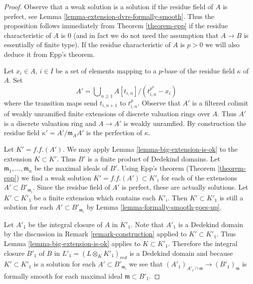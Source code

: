 \begin{proof}
Observe that a weak solution is a solution if the residue field of $A$
is perfect, see Lemma \ref{lemma-extension-dvrs-formally-smooth}.
Thus the proposition follows immediately from Theorem \ref{theorem-epp}
if the residue characteristic of $A$ is $0$ (and in fact we do not need
the assumption that $A \to B$ is essentially of finite type).
If the residue characteristic of $A$ is $p > 0$ we will also deduce it from
Epp's theorem.

\medskip\noindent
Let $x_i \in A$, $i \in I$ be a set of elements mapping to a $p$-base of
the residue field $\kappa$ of $A$. Set
$$
A' = \bigcup\nolimits_{n \geq 1} A[t_{i, n}]/(t_{i, n}^{p^n} - x_i)
$$
where the transition maps send $t_{i, n + 1}$ to $t_{i, n}^p$. Observe
that $A'$ is a filtered colimit of weakly unramified finite extensions
of discrete valuation rings over $A$. Thus $A'$ is a discrete valuation
ring and $A \to A'$ is weakly unramfied. By construction the residue field
$\kappa' = A'/\mathfrak m_A A'$ is the perfection of $\kappa$.

\medskip\noindent
Let $K' = f.f.(A')$. We may apply Lemma \ref{lemma-big-extension-is-ok}
to the extension $K \subset K'$. Thus $B'$ is a finite product of
Dedekind domains. Let $\mathfrak m_1, \ldots, \mathfrak m_n$ be the
maximal ideals of $B'$. Using Epp's theorem (Theorem \ref{theorem-epp})
we find a weak solution $K' = f.f.(A') \subset K'_i$ for each of the
extensions $A' \subset B'_{\mathfrak m_i}$. Since the residue field
of $A'$ is perfect, these are actually solutions. Let $K' \subset K'_1$
be a finite extension which contains each $K'_i$. Then $K' \subset K'_1$
is still a solution for each $A' \subset B'_{\mathfrak m_i}$ by
Lemma \ref{lemma-formally-smooth-goes-up}.

\medskip\noindent
Let $A'_1$ be the integral closure of $A$ in $K'_1$. Note that
$A'_1$ is a Dedekind domain by the discussion in
Remark \ref{remark-construction} applied to $K' \subset K'_1$.
Thus Lemma \ref{lemma-big-extension-is-ok} applies to $K \subset K'_1$.
Therefore the integral closure $B'_1$ of $B$ in
$L'_1 = (L \otimes_K K'_1)_{red}$ is a Dedekind domain and because
$K' \subset K'_1$ is a solution for each $A' \subset B'_{\mathfrak m_i}$
we see that $(A'_1)_{A'_1 \cap \mathfrak m} \to (B'_1)_{\mathfrak m}$
is formally smooth for each maximal ideal $\mathfrak m \subset B'_1$.


\end{proof}
